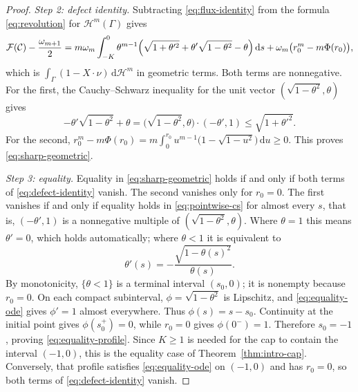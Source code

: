 \documentclass[11pt,a4paper]{article}
\numberwithin{equation}{section}
\theoremstyle{paperplain}
\theoremstyle{remark}
\newcommand{\C}{\mathcal{C}}
\newcommand{\HH}{\mathcal{H}}
\newcommand{\dd}{\,\mathrm d}
\begin{document}
\begin{proof}
\emph{Step 2: defect identity.} Subtracting \eqref{eq:flux-identity} from
the formula \eqref{eq:revolution} for $\HH^m(\Gamma)$ gives
\begin{equation}\label{eq:defect-identity}
 \mathcal F(\C)-\frac{\omega_{m+1}}2
 =m\omega_m\int_{-K}^0\theta^{m-1}
    \Bigl(\sqrt{1+\theta'^2}+\theta'\sqrt{1-\theta^2}-\theta\Bigr)\dd s
  +\omega_m\bigl(r_0^m-m\Phi(r_0)\bigr),
\end{equation}
which is $\int_\Gamma(1-X\cdot\nu)\dd\HH^m$ in geometric terms. Both terms are
nonnegative. For the first, the Cauchy--Schwarz inequality for the unit vector
$(\sqrt{1-\theta^2},\theta)$ gives
\begin{equation}\label{eq:pointwise-cs}
 -\theta'\sqrt{1-\theta^2}+\theta
 =\bigl(\sqrt{1-\theta^2},\theta\bigr)\cdot(-\theta',1)
 \le\sqrt{1+\theta'^2}.
\end{equation}
For the second,
$r_0^m-m\Phi(r_0)=m\int_0^{r_0}u^{m-1}\bigl(1-\sqrt{1-u^2}\bigr)\dd u\ge0$.
This proves \eqref{eq:sharp-geometric}.

\emph{Step 3: equality.} Equality in \eqref{eq:sharp-geometric} holds if and
only if both terms of \eqref{eq:defect-identity} vanish. The second vanishes
only for $r_0=0$. The first vanishes if and only if equality holds in
\eqref{eq:pointwise-cs} for almost every $s$, that is, $(-\theta',1)$ is a
nonnegative multiple of $(\sqrt{1-\theta^2},\theta)$. Where $\theta=1$ this
means $\theta'=0$, which holds automatically; where $\theta<1$ it is
equivalent to
\begin{equation}\label{eq:equality-ode}
 \theta'(s)=-\frac{\sqrt{1-\theta(s)^2}}{\theta(s)}.
\end{equation}
By monotonicity, $\{\theta<1\}$ is a terminal interval $(s_0,0)$; it is
nonempty because $r_0=0$. On each compact subinterval,
$\phi=\sqrt{1-\theta^2}$ is Lipschitz, and \eqref{eq:equality-ode} gives
$\phi'=1$ almost everywhere. Thus $\phi(s)=s-s_0$. Continuity at the initial
point gives $\phi(s_0^+)=0$, while $r_0=0$ gives $\phi(0^-)=1$. Therefore
$s_0=-1$, proving \eqref{eq:equality-profile}. Since $K\ge1$ is needed for
the cap to contain the interval $(-1,0)$, this is the equality case of
Theorem~\ref{thm:intro-cap}. Conversely, that profile satisfies
\eqref{eq:equality-ode} on $(-1,0)$ and has $r_0=0$, so both terms of
\eqref{eq:defect-identity} vanish.
\end{proof}
\end{document}
